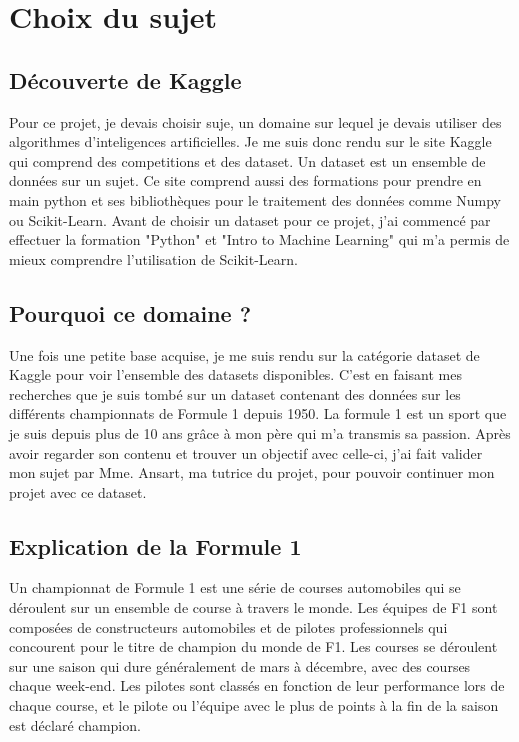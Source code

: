 \chapter{Choix du sujet}

\section{Découverte de Kaggle}
Pour ce projet, je devais choisir suje, un domaine sur lequel je devais utiliser des algorithmes d'inteligences artificielles. Je me suis donc rendu sur le site Kaggle qui comprend des competitions et des dataset. Un dataset est un ensemble de données sur un sujet. Ce site comprend aussi des formations pour prendre en main python et ses bibliothèques pour le traitement des données comme Numpy ou Scikit-Learn. Avant de choisir un dataset pour ce projet, j'ai commencé par effectuer la formation "Python" et "Intro to Machine Learning" qui m'a permis de mieux comprendre l'utilisation de Scikit-Learn.

\section{Pourquoi ce domaine ?}
Une fois une petite base acquise, je me suis rendu sur la catégorie dataset de Kaggle pour voir l'ensemble des datasets disponibles. C'est en faisant mes recherches que je suis tombé sur un dataset contenant des données sur les différents championnats de Formule 1 depuis 1950. La formule 1 est un sport que je suis depuis plus de 10 ans grâce à mon père qui m'a transmis sa passion. Après avoir regarder son contenu et trouver un objectif avec celle-ci, j'ai fait valider mon sujet par Mme. Ansart, ma tutrice du projet, pour pouvoir continuer mon projet avec ce dataset.

\section{Explication de la Formule 1}
Un championnat de Formule 1 est une série de courses automobiles qui se déroulent sur un ensemble de course à travers le monde. Les équipes de F1 sont composées de constructeurs automobiles et de pilotes professionnels qui concourent pour le titre de champion du monde de F1. Les courses se déroulent sur une saison qui dure généralement de mars à décembre, avec des courses chaque week-end. Les pilotes sont classés en fonction de leur performance lors de chaque course, et le pilote ou l'équipe avec le plus de points à la fin de la saison est déclaré champion.\\

